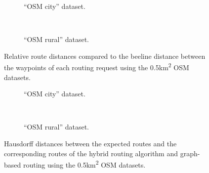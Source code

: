 			\begin{figure}[h!]
				\begin{subfigure}[t]{\linewidth}
					\begin{figcenter}
						
					\end{figcenter}
					\caption{\enquote{OSM city} dataset.}
					\label{fig:eval-route-distances-city}
				\end{subfigure}
				\\[3ex]
				\begin{subfigure}[t]{\linewidth}
					\begin{figcenter}
						
					\end{figcenter}
					\caption{\enquote{OSM rural} dataset.}
					\label{fig:eval-route-distances-rural}
				\end{subfigure}
				\caption{Relative route distances compared to the beeline distance between the waypoints of each routing request using the 0.5km\textsuperscript{2} OSM datasets.}
				\label{fig:eval-route-distances}
				\vspace{3ex}
				
				\begin{subfigure}[t]{\linewidth}
					\begin{figcenter}
						
					\end{figcenter}
					\caption{\enquote{OSM city} dataset.}
					\label{fig:eval-hausdorff-city}
				\end{subfigure}
				\\[3ex]
				\begin{subfigure}[t]{\linewidth}
					\begin{figcenter}
						
					\end{figcenter}
					\caption{\enquote{OSM rural} dataset.}
					\label{fig:eval-hausdorff-rural}
				\end{subfigure}
				\caption{Hausdorff distances between the expected routes and the corresponding routes of the hybrid routing algorithm and graph-based routing using the 0.5km\textsuperscript{2} OSM datasets.}
				\label{fig:eval-hausdorff}
			\end{figure}
			\clearpage

